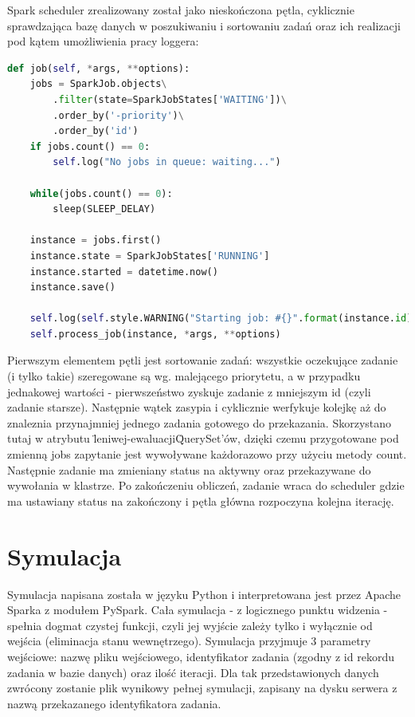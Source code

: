 \documentclass[a4paper,onecolumn,oneside,12pt]{memoir}
\begin{document}
{Spark scheduler zrealizowany został jako nieskończona pętla, cyklicznie sprawdzająca
bazę danych w poszukiwaniu i sortowaniu zadań oraz ich realizacji pod kątem umożliwienia
pracy loggera:

\begin{lstlisting}[language=Python, caption=Główna pętla Spark Schedulera]
def job(self, *args, **options):
	jobs = SparkJob.objects\
		.filter(state=SparkJobStates['WAITING'])\
		.order_by('-priority')\
		.order_by('id')
	if jobs.count() == 0:
		self.log("No jobs in queue: waiting...")

	while(jobs.count() == 0):
		sleep(SLEEP_DELAY)

	instance = jobs.first()
	instance.state = SparkJobStates['RUNNING']
	instance.started = datetime.now()
	instance.save()

	self.log(self.style.WARNING("Starting job: #{}".format(instance.id)))
	self.process_job(instance, *args, **options)
\end{lstlisting}

Pierwszym elementem pętli jest sortowanie zadań: wszystkie oczekujące zadanie (i tylko takie)
szeregowane są wg. malejącego priorytetu, a w przypadku jednakowej wartości - pierwszeństwo
zyskuje zadanie z mniejszym id (czyli zadanie starsze). Następnie wątek zasypia i cyklicznie
werfykuje kolejkę aż do znaleznia przynajmniej jednego zadania gotowego do przekazania.
Skorzystano tutaj w atrybutu \"leniwej-ewaluacji\" QuerySet'ów, dzięki czemu przygotowane
pod zmienną jobs zapytanie jest wywoływane każdorazowo przy użyciu metody count.
Następnie zadanie ma zmieniany status na aktywny oraz przekazywane do wywołania w klastrze.
Po zakończeniu obliczeń, zadanie wraca do scheduler gdzie ma ustawiany status na zakończony
i pętla główna rozpoczyna kolejna iterację.

\section{Symulacja}
\quad \quad Symulacja napisana została w języku Python i interpretowana jest przez Apache Sparka
z modułem PySpark. Cała symulacja - z logicznego punktu widzenia - spełnia dogmat czystej funkcji,
czyli jej wyjście zależy tylko i wyłącznie od wejścia (eliminacja stanu wewnętrzego). Symulacja
przyjmuje 3 parametry wejściowe: nazwę pliku wejściowego, identyfikator zadania (zgodny z id
rekordu zadania w bazie danych) oraz ilość iteracji. Dla tak przedstawionych danych zwrócony
zostanie plik wynikowy pełnej symulacji, zapisany na dysku serwera z nazwą przekazanego
identyfikatora zadania.

}
\end{document}
